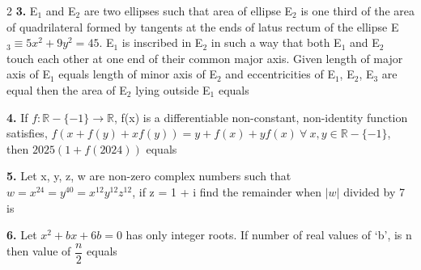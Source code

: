 \documentclass[10pt]{extarticle}
\begin{document}
\begin{multicols}{2}
\textbf{3.} E$_1$ and E$_2$ are two ellipses such that area of ellipse E$_2$ is one third of the area of quadrilateral formed by tangents at the ends of latus rectum of the ellipse E$_3\equiv5x^2+9y^2=45$. E$_1$ is inscribed in E$_2$ in such a way that both E$_1$ and E$_2$ touch each other at one end of their common major axis. Given length of major axis of E$_1$ equals length of minor axis of E$_2$ and eccentricities of E$_1$, E$_2$, E$_3$ are equal then the area of E$_2$ lying outside E$_1$ equals

\textbf{4.} If $f:\mathbb R-\{-1\}\to\mathbb R$, f(x) is a differentiable non-constant, non-identity function satisfies, $f(x+f(y)+xf(y))=y+f(x)+yf(x)\ \forall\ x,y\in\mathbb R-\{-1\}$, then $2025(1+f(2024))$ equals

\textbf{5.} Let x, y, z, w are non-zero complex numbers such that $w=x^{24}=y^{40}=x^{12}y^{12}z^{12}$, if z = 1 + i find the remainder when $|w|$ divided by 7 is

\textbf{6.} Let $x^2+bx+6b=0$ has only integer roots. If number of real values of `b', is n then value of $\dfrac n2$ equals

\end{multicols}
\end{document}
